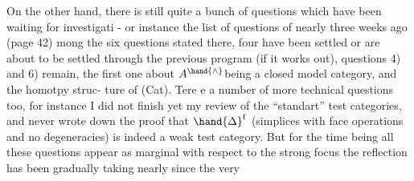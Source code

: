 On the other hand,  there is still quite a bunch of questions which
have been waiting for investigati - or instance the list of questions
of nearly three weeks ago (page 42) mong the six questions stated
there,  four have been settled\hand{,} or are about to be settled through the
previous program (if it works out),  questions 4) and 6) remain,  the
first one  about $A^{\hand{\wedge}}$being a closed model category,  and  the homotpy struc-%
ture of (Cat).  Tere e a number of more technical questions too,  for
instance I did not finish yet my review of the ``standart'' test categories,
and never wrote down the proof that $\hand{\Delta}^{\mathrm{f}}$ (simplices with face operations
and no degeneracies)  is indeed a weak test category.  But for the time
being all these questions appear as  marginal with respect to the strong
focus the reflection has been gradually taking nearly since the very

